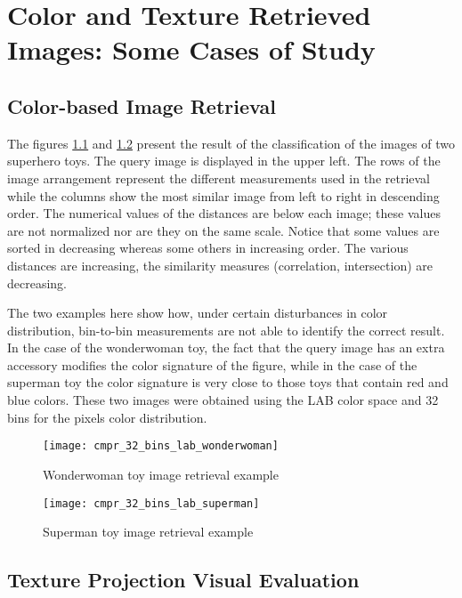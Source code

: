 
\chapter{Color and Texture Retrieved Images: Some Cases of Study}\label{ch:suplementary_material_retrieval_systems}

\section{Color-based Image Retrieval}\label{sec:sm_color:class}
The figures \ref{fig:wonderwoman_distances} and \ref{fig:superman_distances} present the result of the classification of the images of two superhero toys. The query image is displayed in the upper left. The rows of the image arrangement represent the different measurements used in the retrieval while the columns show the most similar image from left to right in descending order. The numerical values of the distances are below each image; these values are not normalized nor are they on the same scale. Notice that some values are sorted in decreasing whereas some others in increasing order. The various distances are increasing, the similarity measures (correlation, intersection) are decreasing.

The two examples here show how, under certain disturbances in color distribution, bin-to-bin measurements are not able to identify the correct result. In the case of the wonderwoman toy, the fact that the query image has an extra accessory modifies the color signature of the figure, while in the case of the superman toy the color signature is very close to those toys that contain red and blue colors. These two images were obtained using the LAB color space and 32 bins for the pixels color distribution.
\begin{figure}[!ht]
 \centering    
 \texttt{[image: cmpr\_32\_bins\_lab\_wonderwoman]}
 \caption{Wonderwoman toy image retrieval example}
 \label{fig:wonderwoman_distances}
\end{figure}

\begin{figure}[!ht]
 \centering    
 \texttt{[image: cmpr\_32\_bins\_lab\_superman]}
 \caption{Superman toy image retrieval example}
 \label{fig:superman_distances}
\end{figure}

\pagebreak
\section{Texture Projection Visual Evaluation}\label{sec:sm_mds}

